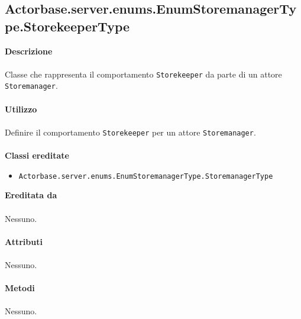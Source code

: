 \documentclass[a4paper]{article}
\begin{document}
			\subsection{Actorbase.server.enums.EnumStoremanagerType.StorekeeperType}
		\textbf{Descrizione}
			\\ \\
			Classe che rappresenta il comportamento \texttt{Storekeeper} da parte di un attore \texttt{Storemanager}.
			\\ \\
		\textbf{Utilizzo}
			\\ \\
			Definire il comportamento \texttt{Storekeeper} per un attore \texttt{Storemanager}.
			\\ \\
		\textbf{Classi ereditate}
			\begin{itemize}
				\item \texttt{Actorbase.server.enums.EnumStoremanagerType.StoremanagerType}
			\end{itemize}
		\textbf{Ereditata da}
		\\ \\
		Nessuno.
		\\ \\
		\textbf{Attributi}
		\\ \\
			Nessuno.
		\\ \\
		\textbf{Metodi}
			\\ \\
			Nessuno.
			
\end{document}
